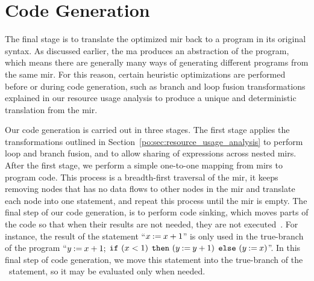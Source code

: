\section{Code Generation}
\label{po:sec:code_generation}

The final stage is to translate the optimized \gls{mir} back to a program
in its original syntax.  As discussed earlier, the \gls{ma} produces an
abstraction of the program, which means there are generally many ways of
generating different programs from the same \gls{mir}\@.  For this reason,
certain heuristic optimizations are performed before or during code generation,
such as branch and loop fusion transformations explained in our resource
usage analysis to produce a unique and deterministic translation from the
\gls{mir}\@.

Our code generation is carried out in three stages.  The first stage applies
the transformations outlined in Section~\ref{po:sec:resource_usage_analysis}
to perform loop and branch fusion, and to allow sharing of expressions
across nested \glspl{mir}. After the first stage, we perform a simple
one-to-one mapping from \glspl{mir} to program code.  This process is a
breadth-first traversal of the \gls{mir}, it keeps removing nodes that
has no data flows to other nodes in the \gls{mir} and translate each
node into one statement, and repeat this process until the \gls{mir}
is empty.  The final step of our code generation, is to perform code
sinking, which moves parts of the code so that when their results are not
needed, they are not executed~\cite{llvm}.  For instance, the result of
the statement ``$x\mathbin{:=}{x + 1}$'' is only used in the true-branch
of the program ``$y\mathbin{:=}{x + 1} \mathbin{;}$ $\texttt{if}~(x < 1)$
$\texttt{then}~(y\mathbin{:=}{y + 1})$ $\texttt{else}~(y\mathbin{:=}{x})$''.  In this
final step of code generation, we move this statement into the true-branch of
the \iflit~statement, so it may be evaluated only when needed.
